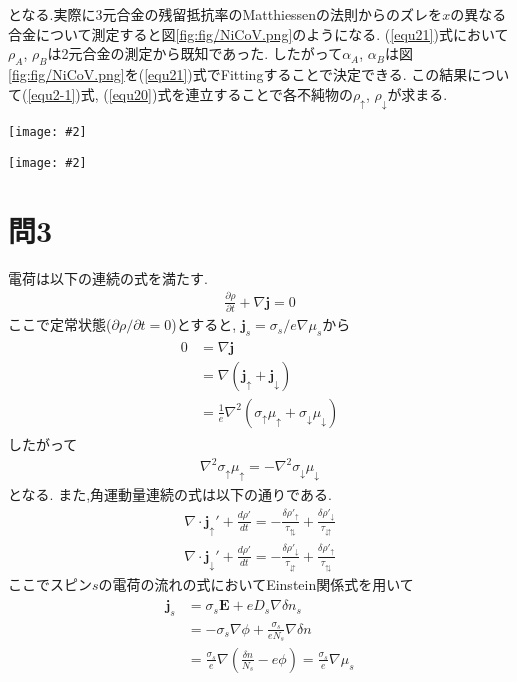 \documentclass[uplatex,a4j,11pt,dvipdfmx]{jsarticle}
\makeatletter
\def\fgcaption{\def\@captype{figure}\caption}
\newcommand{\mfig}[3][width=15cm]{
\begin{center}
\texttt{[image: \#2]}
\fgcaption{#3 \label{fig:#2}}
\end{center}
}
\makeatother
\begin{document}
となる.実際に3元合金の残留抵抗率のMatthiessenの法則からのズレを$x$の異なる合金について測定すると図\ref{fig:fig/NiCoV.png}のようになる.
(\ref{equ21})式において$\rho_A$, $\rho_B$は2元合金の測定から既知であった.
したがって$\alpha_A$, $\alpha_B$は図\ref{fig:fig/NiCoV.png}を(\ref{equ21})式でFittingすることで決定できる.
この結果について(\ref{equ2-1})式, (\ref{equ20})式を連立することで各不純物の$\rho_\uparrow$, $\rho_\downarrow$が求まる.\cite{kiso}\cite{fert_electrical_1976}
\mfig[width=8cm]{fig/2cm_3.png}{2流体モデルでの3元素合金の抵抗率の計算}
\mfig[width=8cm]{fig/NiCoV.png}{${\rm NiCo}_{1-x}{\rm V}_x$合金の残留抵抗率のMatthiessenの法則からのズレ\cite{fert_electrical_1976}}
\clearpage
\section*{問3}
電荷は以下の連続の式を満たす.
\begin{align}
  \frac{\partial\rho}{\partial t}+\nabla{\bm j}=0
\end{align}
ここで定常状態($\partial\rho/\partial t=0$)とすると, ${\bm j}_s=\sigma_s/e\nabla\mu_s$から
\begin{align}
  \begin{split}
    0&=\nabla{\bm j}\\
    &=\nabla({\bm j}_\uparrow+{\bm j}_\downarrow)\\
    &=\frac{1}{e}\nabla^2(\sigma_\uparrow\mu_\uparrow+\sigma_\downarrow\mu_\downarrow)
  \end{split}
\end{align}
したがって
\begin{align}
  \label{equ30}
  \nabla^2\sigma_\uparrow\mu_\uparrow=-\nabla^2\sigma_\downarrow\mu_\downarrow
\end{align}
となる.
また,角運動量連続の式は以下の通りである.
\begin{align}
  \label{equ31}
  \nabla\cdot{\bm j}_\uparrow'+\frac{d\rho'}{dt}=-\frac{\delta\rho'_\uparrow}{\tau_\updownarrows}+\frac{\delta\rho'_\downarrow}{\tau_\downuparrows}\\
  \label{equ32}
  \nabla\cdot{\bm j}_\downarrow'+\frac{d\rho'}{dt}=-\frac{\delta\rho'_\downarrow}{\tau_\downuparrows}+\frac{\delta\rho'_\uparrow}{\tau_\updownarrows}
\end{align}
ここでスピン$s$の電荷の流れの式においてEinstein関係式を用いて
\begin{align}
  \begin{split}
    {\bm j}_s&=\sigma_s{\bm E}+eD_s\nabla\delta n_s\\
    &=-\sigma_s\nabla\phi+\frac{\sigma_s}{eN_s}\nabla\delta n\\
    &=\frac{\sigma_s}{e}\nabla\left(\frac{\delta n}{N_s}-e\phi\right)=\frac{\sigma_s}{e}\nabla\mu_s
  \end{split}
\end{align}
\end{document}
